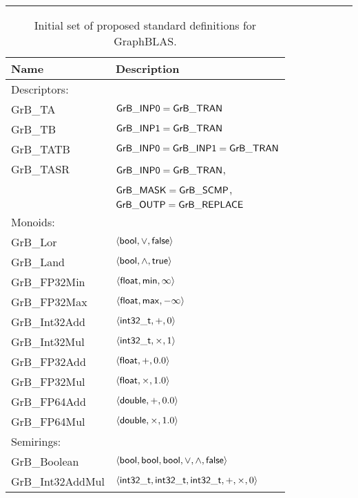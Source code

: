\begin{table}[bt]
	\hrule
	\caption{Initial set of proposed standard definitions for GraphBLAS.}
	\label{Tab:stddef}
	\begin{center}
	\begin{tabular}{|l|l|} \hline
		 Name				& Description \\ \hline
         Descriptors: & \\
				{\sf GrB\_TA}			& ${\sf GrB\_INP0} = {\sf GrB\_TRAN}$ \\
                {\sf GrB\_TB}			& ${\sf GrB\_INP1} = {\sf GrB\_TRAN}$ \\ 
				{\sf GrB\_TATB}		& ${\sf GrB\_INP0} = {\sf GrB\_INP1} = {\sf GrB\_TRAN}$ \\
				{\sf GrB\_TASR}		& ${\sf GrB\_INP0} = {\sf GrB\_TRAN}$, \\
							& ${\sf GrB\_MASK} = {\sf GrB\_SCMP}$, \\
							& ${\sf GrB\_OUTP} = {\sf GrB\_REPLACE}$ \\ \hline
		Monoids:	& \\
				{\sf GrB\_Lor}		& $\left\langle {\sf bool}, \vee, {\sf false} \right\rangle$ \\
				{\sf GrB\_Land}		& $\left\langle {\sf bool}, \wedge, {\sf true} \right\rangle$ \\
				{\sf GrB\_FP32Min}		& $\left\langle {\sf float}, {\sf min}, \infty \right\rangle$ \\
				{\sf GrB\_FP32Max}		& $\left\langle {\sf float}, {\sf max}, -\infty \right\rangle$ \\
				{\sf GrB\_Int32Add}		& $\left\langle {\sf int32\_t}, +, 0 \right\rangle$ \\
                {\sf GrB\_Int32Mul}		& $\left\langle {\sf int32\_t}, \times, 1 \right\rangle$ \\
				{\sf GrB\_FP32Add}		& $\left\langle {\sf float}, +, 0.0 \right\rangle$ \\
				{\sf GrB\_FP32Mul}		& $\left\langle {\sf float}, \times, 1.0 \right\rangle$ \\
				{\sf GrB\_FP64Add}		& $\left\langle {\sf double}, +, 0.0 \right\rangle$ \\ 
				{\sf GrB\_FP64Mul}		& $\left\langle {\sf double}, \times, 1.0 \right\rangle$ \\ \hline
		Semirings:	& \\
				{\sf GrB\_Boolean}		& $\left\langle {\sf bool}, {\sf bool}, {\sf bool}, \vee, \wedge, {\sf false} \right\rangle$ \\
                {\sf GrB\_Int32AddMul}	& $\left\langle {\sf int32\_t}, {\sf int32\_t}, {\sf int32\_t}, +, \times, 0 \right\rangle$ \\

\end{tabular}
\end{center}
\end{table}
